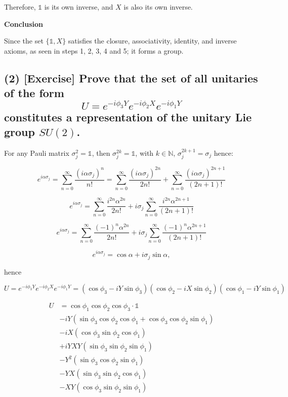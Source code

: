 \documentclass[12pt]{article}
\begin{document}
\begin{flushleft}
Therefore, \( \mathds{1} \) is its own inverse, and \( X \) is also its own inverse.

\textbf{Conclusion}

Since the set \( \{\mathds{1}, X\} \) satisfies the closure, associativity, identity, and inverse axioms, as seen in steps 1, 2, 3, 4 and 5; it forms a group. 


\subsection*{(2) [Exercise] Prove that the set of all unitaries of the form
\[
U = e^{-i\phi_3 Y} e^{-i\phi_2 X} e^{-i\phi_1 Y}
\]
constitutes a representation of the unitary Lie group \( SU(2) \).}


For any Pauli matrix \( \sigma_{j}^{2} = \mathds{1}\), then \( \sigma_{j}^{2k} = \mathds{1}\), with \( k \in \mathds{N}\), \(\sigma_{j}^{2k+1} = \sigma_{j} \) hence:

\[
e^{i \alpha \sigma_{j}} = \sum^{\infty}_{n=0} \frac{(i \alpha \sigma_{j})^{n}}{n!} = \sum^{\infty}_{n=0} \frac{(i \alpha \sigma_{j})^{2n}}{2n!} + \sum^{\infty}_{n=0} \frac{(i \alpha \sigma_{j})^{2n+1}}{(2n+1)!} 
\]

\[
e^{i \alpha \sigma_{j}} =\sum^{\infty}_{n=0} \frac{i^{2n} \alpha ^{2n}}{2n!} + i \sigma_{j} \sum^{\infty}_{n=0} \frac{i^{2n} \alpha^{2n+1}}{(2n+1)!}
\]

\[
e^{i \alpha \sigma_{j}} = \sum^{\infty}_{n=0} \frac{(-1)^{n} \alpha ^{2n}}{2n!} + i \sigma_{j} \sum^{\infty}_{n=0} \frac{(-1)^{n} \alpha^{2n+1}}{(2n+1)!}
\]

\[
e^{i \alpha \sigma_{j}} = \cos{\alpha} + i \sigma_{j} \sin{\alpha} ,
\]

hence


\[
U = e^{-i\phi_3 Y} e^{-i\phi_2 X} e^{-i\phi_1 Y} = \left(\cos{\phi_{3}} - i Y\sin{\phi_{3}}\right)\left(\cos{\phi_{2}} - i X\sin{\phi_{2}}\right) \left(\cos{\phi_{1}} - i Y\sin{\phi_{1}}\right)
\]


\begin{align*}
    U &= \cos{\phi_{1}}\cos{\phi_{2}}\cos{\phi_{3}} \cdot \mathds{1} \\
    &-iY\left(\sin{\phi_{3}}\cos{\phi_{2}}\cos{\phi_{1}} + \cos{\phi_{3}}\cos{\phi_{2}}\sin{\phi_{1}}    \right) \\
    &-iX \left(\cos{\phi_{3}}\sin{\phi_{2}}\cos{\phi_{1}}\right) \\
    &+i YXY \left(\sin{\phi_{3}}\sin{\phi_{2}}\sin{\phi_{1}}\right) \\
    &-Y^{2} \left(\sin{\phi_{3}}\cos{\phi_{2}}\sin{\phi_{1}}\right) \\
    &-YX \left(\sin{\phi_{3}}\sin{\phi_{2}}\cos{\phi_{1}}\right) \\
    &-XY \left(\cos{\phi_{3}}\sin{\phi_{2}}\sin{\phi_{1}}\right) \\
\end{align*}


\end{flushleft}
\end{document}
